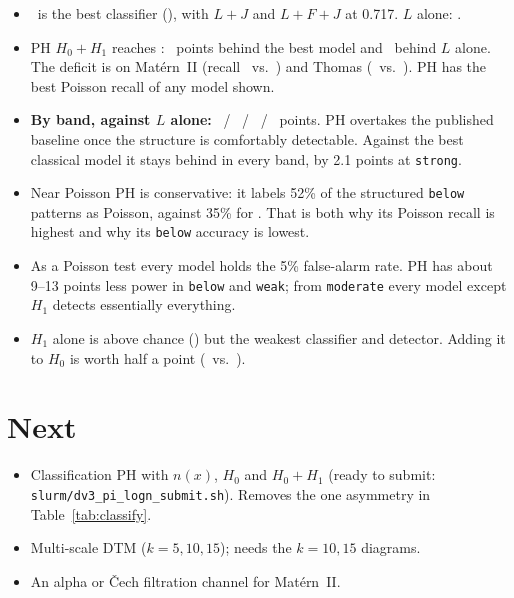 \documentclass[10pt,a4paper]{article}
\begin{document}
\begin{itemize}
  \item \cBestName\ is the best classifier (\cBestAcc), with $L{+}J$ and $L{+}F{+}J$ at 0.717. $L$ alone: \cLAcc.
  \item PH $H_0{+}H_1$ reaches \cPhAcc: \cGapBest\ points behind the best model and \cGapL\ behind $L$ alone. The deficit is on Mat\'ern~II (recall \cRecMaternPh\ vs.\ \cRecMaternBest) and Thomas (\cRecThomasPh\ vs.\ \cRecThomasBest). PH has the best Poisson recall of any model shown.
  \item \textbf{By band, against $L$ alone:} \cVsLBelow\ / \cVsLWeak\ / \cVsLModerate\ / \cVsLStrong\ points. PH overtakes the published baseline once the structure is comfortably detectable. Against the best classical model it stays behind in every band, by 2.1 points at \texttt{strong}.
  \item Near Poisson PH is conservative: it labels 52\% of the structured \texttt{below} patterns as Poisson, against 35\% for \cBestName. That is both why its Poisson recall is highest and why its \texttt{below} accuracy is lowest.
  \item As a Poisson test every model holds the 5\% false-alarm rate. PH has about 9--13 points less power in \texttt{below} and \texttt{weak}; from \texttt{moderate} every model except $H_1$ detects essentially everything.
  \item $H_1$ alone is above chance (\cPhOneAcc) but the weakest classifier and detector. Adding it to $H_0$ is worth half a point (\cPhAcc\ vs.\ \cPhZeroAcc).
\end{itemize}

\section{Next}

\begin{itemize}
  \item Classification PH with $n(x)$, $H_0$ and $H_0{+}H_1$ (ready to submit: \texttt{slurm/dv3\_pi\_logn\_submit.sh}). Removes the one asymmetry in Table~\ref{tab:classify}.
  \item Multi-scale DTM ($k=5,10,15$); needs the $k=10,15$ diagrams.
  \item An alpha or \v{C}ech filtration channel for Mat\'ern~II.
\end{itemize}
\end{document}
